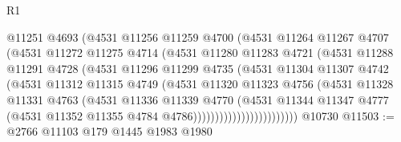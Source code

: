 \begin{lexlean}{R1}
\begin{coremodule}
                          @11251
                          @4693
                          (@4531
                            @11256
                            @11259
                            @4700
                            (@4531
                              @11264
                              @11267
                              @4707
                              (@4531
                                @11272
                                @11275
                                @4714
                                (@4531
                                  @11280
                                  @11283
                                  @4721
                                  (@4531
                                    @11288
                                    @11291
                                    @4728
                                    (@4531
                                      @11296
                                      @11299
                                      @4735
                                      (@4531
                                        @11304
                                        @11307
                                        @4742
                                        (@4531
                                          @11312
                                          @11315
                                          @4749
                                          (@4531
                                            @11320
                                            @11323
                                            @4756
                                            (@4531
                                              @11328
                                              @11331
                                              @4763
                                              (@4531
                                                @11336
                                                @11339
                                                @4770
                                                (@4531
                                                  @11344
                                                  @11347
                                                  @4777
                                                  (@4531
                                                    @11352
                                                    @11355
                                                    @4784
                                                    @4786))))))))))))))))))))))))
    @10730
@11503 := @2766 @11103 @179 @1445 @1983 @1980

\end{coremodule}
\end{lexlean}
